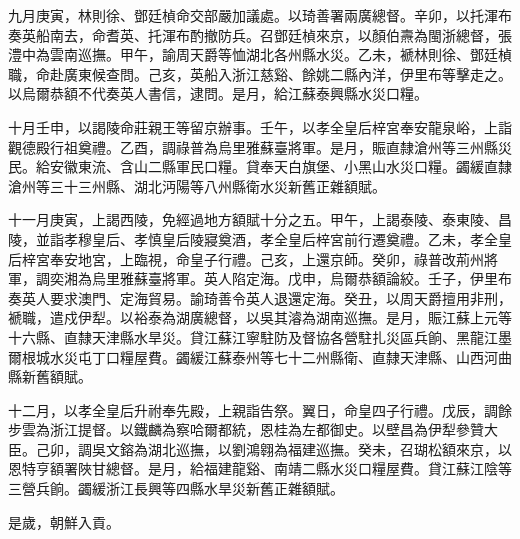 \begin{pinyinscope}
九月庚寅，林則徐、鄧廷楨命交部嚴加議處。以琦善署兩廣總督。辛卯，以托渾布奏英船南去，命耆英、托渾布酌撤防兵。召鄧廷楨來京，以顏伯燾為閩浙總督，張澧中為雲南巡撫。甲午，諭周天爵等恤湖北各州縣水災。乙未，褫林則徐、鄧廷楨職，命赴廣東候查問。己亥，英船入浙江慈谿、餘姚二縣內洋，伊里布等擊走之。以烏爾恭額不代奏英人書信，逮問。是月，給江蘇泰興縣水災口糧。

十月壬申，以謁陵命莊親王等留京辦事。壬午，以孝全皇后梓宮奉安龍泉峪，上詣觀德殿行祖奠禮。乙酉，調祿普為烏里雅蘇臺將軍。是月，賑直隸滄州等三州縣災民。給安徽東流、含山二縣軍民口糧。貸奉天白旗堡、小黑山水災口糧。蠲緩直隸滄州等三十三州縣、湖北沔陽等八州縣衛水災新舊正雜額賦。

十一月庚寅，上謁西陵，免經過地方額賦十分之五。甲午，上謁泰陵、泰東陵、昌陵，並詣孝穆皇后、孝慎皇后陵寢奠酒，孝全皇后梓宮前行遷奠禮。乙未，孝全皇后梓宮奉安地宮，上臨視，命皇子行禮。己亥，上還京師。癸卯，祿普改荊州將軍，調奕湘為烏里雅蘇臺將軍。英人陷定海。戊申，烏爾恭額論絞。壬子，伊里布奏英人要求澳門、定海貿易。諭琦善令英人退還定海。癸丑，以周天爵擅用非刑，褫職，遣戍伊犁。以裕泰為湖廣總督，以吳其濬為湖南巡撫。是月，賑江蘇上元等十六縣、直隸天津縣水旱災。貸江蘇江寧駐防及督協各營駐扎災區兵餉、黑龍江墨爾根城水災屯丁口糧屋費。蠲緩江蘇泰州等七十二州縣衛、直隸天津縣、山西河曲縣新舊額賦。

十二月，以孝全皇后升祔奉先殿，上親詣告祭。翼日，命皇四子行禮。戊辰，調餘步雲為浙江提督。以鐵麟為察哈爾都統，恩桂為左都御史。以壁昌為伊犁參贊大臣。己卯，調吳文鎔為湖北巡撫，以劉鴻翱為福建巡撫。癸未，召瑚松額來京，以恩特亨額署陜甘總督。是月，給福建龍谿、南靖二縣水災口糧屋費。貸江蘇江陰等三營兵餉。蠲緩浙江長興等四縣水旱災新舊正雜額賦。

是歲，朝鮮入貢。


\end{pinyinscope}